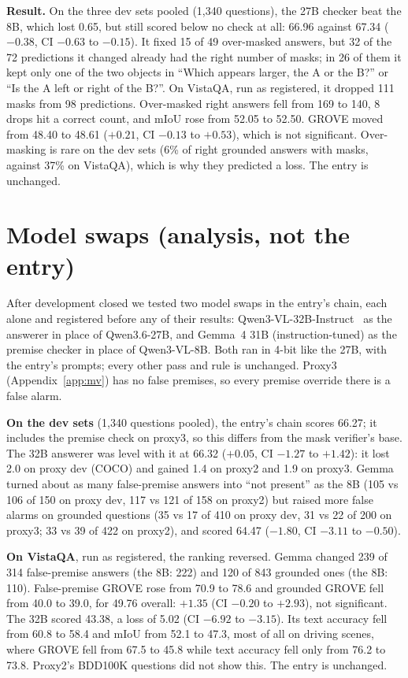 \documentclass{article}
\begin{document}
\textbf{Result.} On the three dev sets pooled (1,340 questions), the 27B checker beat the 8B, which lost 0.65, but still scored
below no check at all: 66.96 against 67.34 ($-0.38$, CI $-0.63$ to $-0.15$). It fixed 15 of 49 over-masked answers, but 32 of the 72
predictions it changed already had the right number of masks; in 26 of them it kept only one of the two objects in ``Which appears
larger, the A or the B?'' or ``Is the A left or right of the B?''. On VistaQA, run as registered, it dropped 111 masks from 98
predictions. Over-masked right answers fell from 169 to 140, 8 drops hit a correct count, and mIoU rose from 52.05 to 52.50. GROVE
moved from 48.40 to 48.61 ($+0.21$, CI $-0.13$ to $+0.53$), which is not significant. Over-masking is rare on the dev sets (6\% of
right grounded answers with masks, against 37\% on VistaQA), which is why they predicted a loss. The entry is unchanged.

\section{Model swaps (analysis, not the entry)}\label{app:ms}
After development closed we tested two model swaps in the entry's chain, each alone and registered before any of their results:
Qwen3-VL-32B-Instruct~\cite{qwen3vl} as the answerer in place of Qwen3.6-27B, and Gemma~4 31B (instruction-tuned)
as the premise checker in place of Qwen3-VL-8B. Both ran in 4-bit like the 27B, with the entry's prompts; every other pass and
rule is unchanged. Proxy3 (Appendix~\ref{app:mv}) has no false premises, so every premise override there is a false alarm.

\textbf{On the dev sets} (1,340 questions pooled), the entry's chain scores 66.27; it includes the premise check on proxy3, so this
differs from the mask verifier's base. The 32B answerer was level with it at 66.32 ($+0.05$, CI $-1.27$ to $+1.42$): it lost 2.0 on
proxy dev (COCO) and gained 1.4 on proxy2 and 1.9 on proxy3. Gemma turned about as many false-premise answers into ``not present''
as the 8B (105 vs 106 of 150 on proxy dev, 117 vs 121 of 158 on proxy2) but raised more false alarms on grounded questions (35 vs 17
of 410 on proxy dev, 31 vs 22 of 200 on proxy3; 33 vs 39 of 422 on proxy2), and scored 64.47 ($-1.80$, CI $-3.11$ to $-0.50$).

\textbf{On VistaQA}, run as registered, the ranking reversed. Gemma changed 239 of 314 false-premise answers (the 8B: 222) and 120 of
843 grounded ones (the 8B: 110). False-premise GROVE rose from 70.9 to 78.6 and grounded GROVE fell from 40.0 to 39.0, for 49.76
overall: $+1.35$ (CI $-0.20$ to $+2.93$), not significant. The 32B scored 43.38, a loss of 5.02 (CI $-6.92$ to $-3.15$). Its text
accuracy fell from 60.8 to 58.4 and mIoU from 52.1 to 47.3, most of all on driving scenes, where GROVE fell from 67.5 to 45.8 while
text accuracy fell only from 76.2 to 73.8. Proxy2's BDD100K questions did not show this. The entry is unchanged.
\end{document}
